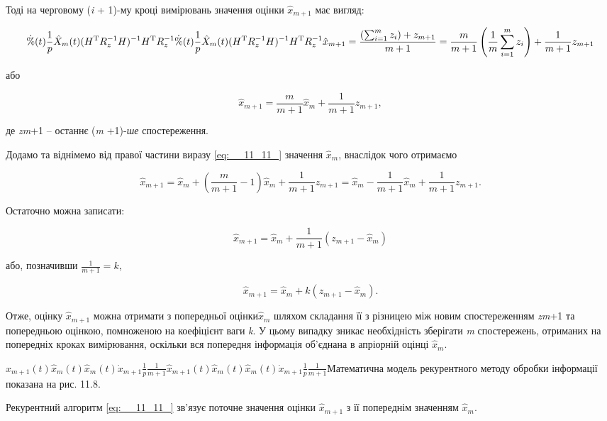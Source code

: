 Тоді на черговому (\textit{i }+ 1)-му кроці вимірювань значення оцінки $\hat{x}_{m+1} $ має 
вигляд:

\[\dot{\% }(t)  \frac{1}{p} \hat{X}_{m} (t)(H^{{\rm T}} R_{z}^{-1} H)^{-1} H^{{\rm 
T}} R_{z}^{-1} \dot{\% }(t)  \frac{1}{p} \hat{X}_{m} (t)(H^{{\rm T}} R_{z}^{-1} H)^{-1} 
H^{{\rm T}} R_{z}^{-1} \hat{x}_{m+1} =\frac{\left(\sum _{i=1}^{m}z_{i}  \right)+z_{m+1} 
}{m+1} =\frac{m}{m+1} \left(\frac{1}{m} \sum _{i=1}^{m}z_{i}  \right)+\frac{1}{m+1} 
z_{m+1} \] 

або              

\[\hat{x}_{m+1} =\frac{m}{m+1} \hat{x}_{m} +\frac{1}{m+1} z_{m+1} ,\] 

де  \textit{zm}+1 -- останнє (\textit{m }+1)-\textit{ше} спостереження.

Додамо та віднімемо від правої частини виразу \eqref{eq:__11_11_} значення $\hat{x}_{m} $, 
внаслідок чого отримаємо

\[\hat{x}_{m+1} =\hat{x}_{m} +\left(\frac{m}{m+1} -1\right)\hat{x}_{m} +\frac{1}{m+1} 
z_{m+1} =\hat{x}_{m} -\frac{1}{m+1} \hat{x}_{m} +\frac{1}{m+1} z_{m+1} .\] 

Остаточно можна записати:

\[\hat{x}_{m+1} =\hat{x}_{m} +\frac{1}{m+1} \left(z_{m+1} -\hat{x}_{m} \right)\] 

або, 
позначивши  $\frac{1}{m+1} =k$,    

\begin{equation} \label{GrindEQ__11_11_} \hat{x}_{m+1} =\hat{x}_{m} +k\left(z_{m+1} 
-\hat{x}_{m} \right). \end{equation} 

Отже, оцінку $\hat{x}_{m+1} $ можна отримати з попередньої оцінки$\hat{x}_{m} $\textbf{ }шляхом 
складання її з різницею між новим  спостереженням \textit{zm}+1 та попередньою оцінкою, 
помноженою  на коефіцієнт ваги \textit{k}. У цьому випадку зникає необхідність зберігати \textit{m} спостережень, 
отриманих на попередніх кроках вимірювання, оскільки вся попередня інформація об'єднана 
в апріорній оцінці $\hat{x}_{m} $.\textbf{}

$\hat{x}_{m+1} (t)$$ $$ $$\hat{x}_{m} (t)$$ $$ $$\hat{x}_{m} (t)$$ $$ $$\dot{x}_{m+1} $$ $$ $$\frac{1}{p} $$\frac{1}{m+1} $$\hat{x}_{m+1} 
(t)$$ $$ $$\hat{x}_{m} (t)$$ $$ $$\hat{x}_{m} (t)$$ $$ $$\dot{x}_{m+1} $$ $$ $$\frac{1}{p} $$\frac{1}{m+1} $Математична 
модель рекурентного методу обробки інформації показана на рис. 11.8.

Рекурентний алгоритм \eqref{eq:__11_11_} зв'язує поточне значення оцінки $\hat{x}_{m+1} $\textbf{ }з 
її попереднім значенням $\hat{x}_{m} $.

